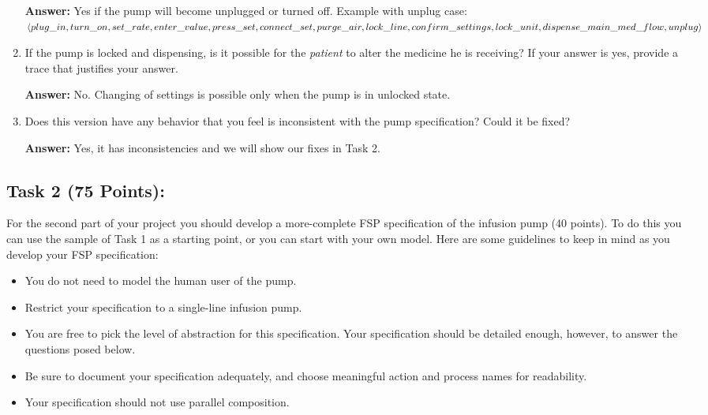\documentclass{article}
\newcommand{\head}{\subsection*}
\begin{document}
\begin{enumerate}
    \textbf{Answer:} Yes if the pump will become unplugged or turned off. Example with unplug case:\\
    $\langle plug\_in, turn\_on, set\_rate, enter\_value, press\_set, connect\_set, purge\_air, lock\_line, confirm\_settings,\\lock\_unit, dispense\_main\_med\_flow, unplug\rangle$
    
    \item If the pump is locked and dispensing, is it possible for the \emph{patient} to alter the medicine he is receiving? If your answer is yes, provide a trace that justifies your answer.
    
    \textbf{Answer:} No. Changing of settings is possible only when the pump is in unlocked state.
    
    \item Does this version have any behavior that you feel is inconsistent with the pump specification? Could it be fixed?
    
    \textbf{Answer:} Yes, it has inconsistencies and we will show our fixes in Task 2.
    
\end{enumerate}

\head{Task 2 (75 Points):}

For the second part of your project you should develop a
more-complete FSP specification of the infusion pump (40 points). To
do this you can use the sample of Task 1 as a starting point, or you
can start with your own model. Here are some guidelines to keep in
mind as you develop your FSP specification:

\begin{itemize}
\item You do not need to model the human user of the pump.

\item Restrict your specification to a single-line infusion pump.

\item You are free to pick the level of abstraction for this specification. Your specification
should be detailed enough, however, to answer the questions posed below.

\item Be sure to document your specification adequately, and choose meaningful action and process names for readability.

\item Your specification should not use parallel composition.

\end{itemize}
\end{document}
